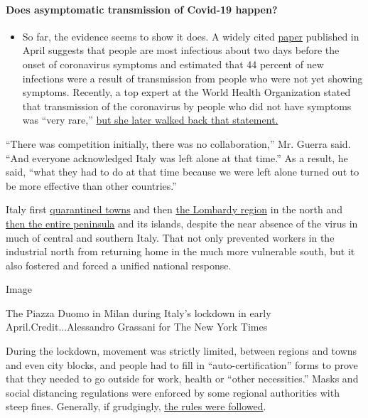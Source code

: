 \begin{itemize}
{  \paragraph{Does asymptomatic transmission of Covid-19
  happen?}\label{does-asymptomatic-transmission-of-covid-19-happen}}

  \begin{itemize}
  \tightlist
  \item
    So far, the evidence seems to show it does. A widely cited
    \href{https://www.nature.com/articles/s41591-020-0869-5}{paper}
    published in April suggests that people are most infectious about
    two days before the onset of coronavirus symptoms and estimated that
    44 percent of new infections were a result of transmission from
    people who were not yet showing symptoms. Recently, a top expert at
    the World Health Organization stated that transmission of the
    coronavirus by people who did not have symptoms was ``very rare,''
    \href{https://www.nytimes.com/2020/06/09/world/coronavirus-updates.html?action=click\&pgtype=Article\&state=default\&region=MAIN_CONTENT_3\&context=storylines_faq\#link-1f302e21}{but
    she later walked back that statement.}
  \end{itemize}
\end{itemize}

``There was competition initially, there was no collaboration,'' Mr.
Guerra said. ``And everyone acknowledged Italy was left alone at that
time.'' As a result, he said, ``what they had to do at that time because
we were left alone turned out to be more effective than other
countries.''

Italy first
\href{https://www.nytimes.com/2020/02/23/world/europe/italy-coronavirus.html}{quarantined
towns} and then
\href{https://www.nytimes.com/2020/03/07/world/europe/coronavirus-italy.html}{the
Lombardy region} in the north and
\href{https://www.nytimes.com/2020/03/09/world/europe/italy-lockdown-coronavirus.html}{then
the entire peninsula} and its islands, despite the near absence of the
virus in much of central and southern Italy. That not only prevented
workers in the industrial north from returning home in the much more
vulnerable south, but it also fostered and forced a unified national
response.

Image

The Piazza Duomo in Milan during Italy's lockdown in early
April.Credit...Alessandro Grassani for The New York Times

During the lockdown, movement was strictly limited, between regions and
towns and even city blocks, and people had to fill in
``auto-certification'' forms to prove that they needed to go outside for
work, health or ``other necessities.'' Masks and social distancing
regulations were enforced by some regional authorities with steep fines.
Generally, if grudgingly,
\href{https://www.nytimes.com/2020/03/10/world/europe/italy-coronavirus-movement-restrictions.html}{the
rules were followed}.

